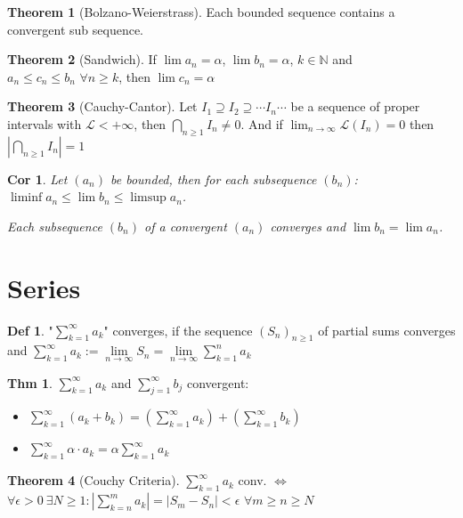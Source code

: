 \documentclass[a4paper, 10pt]{article}
\newtheorem*{corollary}{Cor}
\theoremstyle{definition}
\newtheorem*{theorem}{Thm}
\newtheorem*{definition}{Def}
\theoremstyle{named}
\newtheorem*{ntheorem_wrapper}{Theorem}
\newenvironment{ntheorem}%
    {\begin{mdframed}[style=important]\begin{ntheorem_wrapper}}%
    {\end{ntheorem_wrapper}\end{mdframed}}
\newcommand{\N}{\mathbb{N}}
\begin{document}
\begin{ntheorem}[Bolzano-Weierstrass]
    Each bounded sequence contains a convergent sub sequence.
\end{ntheorem}

\begin{ntheorem}[Sandwich]
    If $\lim a_n = \alpha$, $\lim b_n = \alpha$, $k \in \N$ and \\
    $a_n \leq c_n \leq b_n$ $\forall n \geq k$, then $\lim c_n = \alpha$
\end{ntheorem}

\begin{ntheorem}[Cauchy-Cantor]
    Let $I_1 \supseteq I_2 \supseteq \cdots I_n \cdots$ be a sequence of proper intervals with $\mathcal{L} < + \infty$, then $\bigcap_{n\geq1} I_n \neq 0$. And if $\lim_{n \to \infty} \mathcal{L}(I_n) = 0$ then $|\bigcap_{n\geq1} I_n| = 1$
\end{ntheorem}

\begin{corollary}
    Let $(a_n)$ be bounded, then for each subsequence $(b_n)$: $\liminf a_n \leq \lim b_n \leq \limsup a_n$.

    Each subsequence $(b_n)$ of a convergent $(a_n)$ converges and $\lim b_n = \lim a_n$.
\end{corollary}

\section{Series}
\begin{definition}
    "$\sum_{k=1}^\infty a_k$" converges, if the sequence $(S_n)_{n \geq 1}$ of partial sums converges and $\sum\limits_{k=1}^\infty a_k := \lim\limits_{n \to \infty} S_n = \lim\limits_{n \to \infty} \sum\limits_{k=1}^n a_k$
\end{definition}

\begin{theorem}
    $\sum_{k = 1}^\infty a_k$ and $\sum_{j = 1}^\infty b_j$ convergent:
    \begin{itemize}
        \item $\sum_{k = 1}^\infty (a_k + b_k) = (\sum_{k = 1}^\infty a_k) + (\sum_{k = 1}^\infty b_k)$
        \item $\sum_{k = 1}^\infty \alpha \cdot a_k = \alpha \sum_{k = 1}^\infty a_k$
    \end{itemize}
\end{theorem}

\begin{ntheorem}[Couchy Criteria]
    $\sum_{k = 1}^\infty a_k$ conv. $\iff$ $\forall \epsilon > 0 \ \exists N \geq 1 : |\sum_{k = n}^m a_k| = |S_m - S_n| < \epsilon$ $\forall m\geq n \geq N$
\end{ntheorem}
\end{document}

